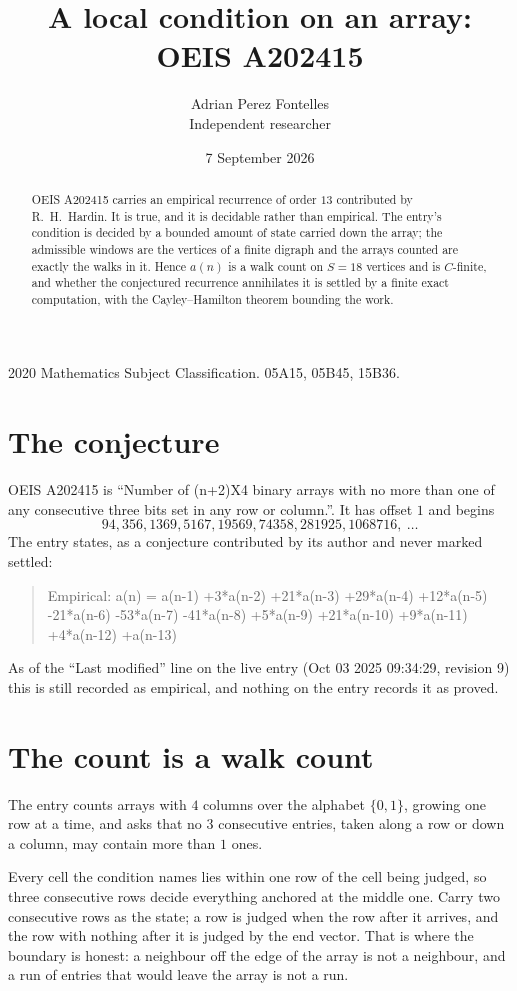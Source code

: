 \documentclass[11pt,a4paper]{article}
\title{A local condition on an array: OEIS A202415}
\author{Adrian Perez Fontelles\\ \small Independent researcher}
\date{7 September 2026}
\theoremstyle{plain}
\theoremstyle{definition}
\begin{document}
\maketitle

\begin{abstract}
OEIS A202415 carries an empirical recurrence of order $13$ contributed by R.~H.~Hardin. It is
true, and it is decidable rather than empirical. The entry's condition is decided by a bounded amount of state carried down the array; the
admissible windows are the vertices of a finite digraph and the arrays counted are exactly the
walks in it. Hence $a(n)$ is a walk count on $S=18$ vertices and is $C$-finite, and whether the
conjectured recurrence annihilates it is settled by a finite exact computation, with the
Cayley--Hamilton theorem bounding the work.
\end{abstract}

\noindent\small 2020 Mathematics Subject Classification. 05A15, 05B45, 15B36.\normalsize

\section{The conjecture}

OEIS A202415 is ``Number of (n+2)X4 binary arrays with no more than one of any consecutive three bits set in any row or column.''. It has offset $1$ and begins
\[
94, 356, 1369, 5167, 19569, 74358, 281925, 1068716,\ \dots
\]
The entry states, as a conjecture contributed by its author and never marked settled:
\begin{quote}
Empirical: a(n) = a(n-1) +3*a(n-2) +21*a(n-3) +29*a(n-4) +12*a(n-5) -21*a(n-6) -53*a(n-7) -41*a(n-8) +5*a(n-9) +21*a(n-10) +9*a(n-11) +4*a(n-12) +a(n-13)
\end{quote}
As of the ``Last modified'' line on the live entry (Oct 03 2025 09:34:29, revision 9) this is still
recorded as empirical, and nothing on the entry records it as proved.

\section{The count is a walk count}

The entry counts arrays with $4$ columns over the alphabet $\{0,1\}$, growing one row at a time, and asks that no $3$ consecutive entries, taken along a row or down a column, may contain more than $1$ ones.

Every cell the condition names lies within one row of the cell being judged, so three consecutive rows decide everything anchored at the middle one. Carry two consecutive rows as the state; a row is judged when the row after it arrives, and the row with nothing after it is judged by the end vector. That is where the boundary is honest: a neighbour off the edge of the array is not a neighbour, and a run of entries that would leave the array is not a run.
\end{document}
